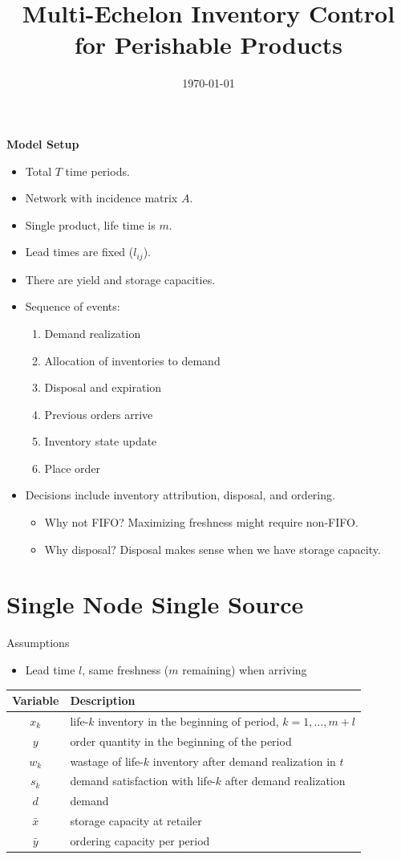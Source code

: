 \documentclass{article}
\title{\textsf{Multi-Echelon Inventory Control for Perishable Products}}
\author{\textsf{}}
\date{\textsf{\today}}
\newcommand{\ra}[1]{
\renewcommand{\arraystretch}{#1}}
\newcommand{\pa}[1]{\noindent\textbf{\textsf{#1}}}
\begin{document}
\maketitle

\pa{Model Setup}
\begin{itemize}
	\item Total $T$ time periods. 
	\item Network with incidence matrix $A$.
	\item Single product, life time is $m$.
	\item Lead times are fixed ($l_{ij}$).
	\item There are yield and storage capacities.
	\item Sequence of events:
	\begin{enumerate}
		\item Demand realization
		\item Allocation of inventories to demand
		\item Disposal and expiration
		\item Previous orders arrive
		\item Inventory state update
		\item Place order
	\end{enumerate}
	\item Decisions include inventory attribution, disposal, and ordering.
	\begin{itemize}
	\item Why not FIFO? Maximizing freshness might require non-FIFO.
	\item Why disposal? Disposal makes sense when we have storage capacity.
	\end{itemize}
\end{itemize}


\section*{Single Node Single Source}

Assumptions
\begin{itemize}
\item Lead time $l$, same freshness ($m$ remaining) when arriving
\end{itemize}

\begin{table}[h!]
\centering
\ra{1.3}
\begin{tabular}{@{}cl@{}}
\toprule
Variable & Description \\
\midrule
$x_{k}$ & life-$k$ inventory in the beginning of period, $k=1,\dots,m+l$\\
$y$ & order quantity in the beginning of the period \\
$w_{k}$ & wastage of life-$k$ inventory after demand realization in $t$ \\ 
$s_{k}$ & demand satisfaction with life-$k$ after demand realization \\
$d$ & demand\\
$\bar{x}$ & storage capacity at retailer \\
$\bar{y}$ & ordering capacity per period \\
\bottomrule
\end{tabular}
\end{table}
\end{document}
